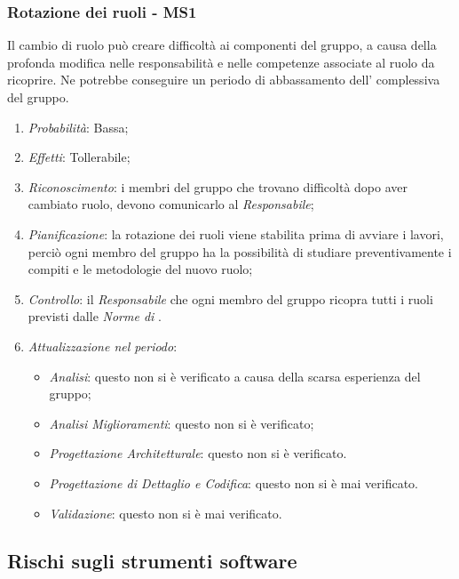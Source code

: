 \subsubsection{Rotazione dei ruoli - MS1}
Il cambio di ruolo pu\`o creare difficolt\`a ai componenti del gruppo, a causa della profonda modifica nelle responsabilit\`a e nelle competenze associate al ruolo da ricoprire. Ne potrebbe conseguire un periodo di abbassamento dell' complessiva del gruppo.
\begin{enumerate}
\item \textit{Probabilit\`a}: Bassa;
\item \textit{Effetti}: Tollerabile;
\item \textit{Riconoscimento}: i membri del gruppo che trovano difficoltà dopo aver cambiato ruolo, devono comunicarlo al \textit{Responsabile};
\item \textit{Pianificazione}: la rotazione dei ruoli viene stabilita prima di avviare i lavori, perci\`o ogni membro del gruppo ha la possibilit\`a di studiare preventivamente i compiti e le metodologie del nuovo ruolo;
\item \textit{Controllo}: il \textit{Responsabile}  che ogni membro del gruppo ricopra tutti i ruoli previsti dalle \textit{Norme di }.
\item \textit{Attualizzazione nel periodo}: 
	\begin{itemize}
	\item \textit{Analisi}: questo  non si è verificato a causa della scarsa esperienza del gruppo;
	\item \textit{Analisi Miglioramenti}: questo  non si è verificato;
	\item \textit{Progettazione Architetturale}: questo  non si è verificato.
	\item \textit{Progettazione di Dettaglio e Codifica}: questo  non si è mai 
	verificato.
	\item \textit{Validazione}: questo  non si è mai verificato.
	\end{itemize}
\end{enumerate}

\subsection{Rischi sugli strumenti software}

